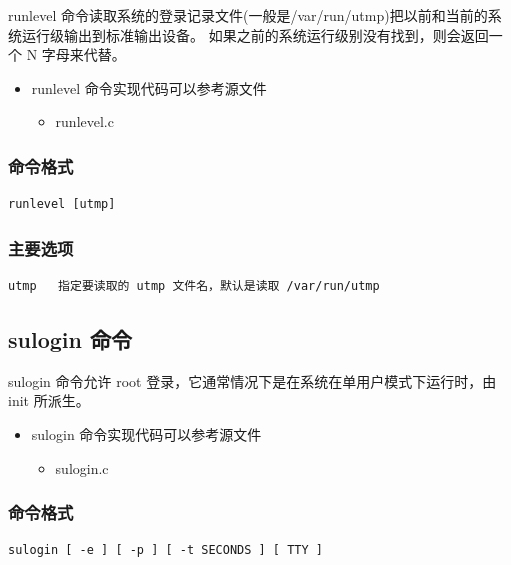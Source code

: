 runlevel
命令读取系统的登录记录文件(一般是/var/run/utmp)把以前和当前的系统运行级输出到标准输出设备。
如果之前的系统运行级别没有找到，则会返回一个 N 字母来代替。

\begin{itemize}
\item
  runlevel 命令实现代码可以参考源文件
  \begin{itemize}
  \item
    runlevel.c
  \end{itemize}
\end{itemize}
\subsubsection{命令格式}

{\begin{shaded}\begin{verbatim}
runlevel [utmp]
\end{verbatim}\end{shaded}}
\subsubsection{主要选项}

{\begin{shaded}\begin{verbatim}
utmp   指定要读取的 utmp 文件名，默认是读取 /var/run/utmp
\end{verbatim}\end{shaded}}
\subsection{sulogin 命令}

sulogin 命令允许 root 登录，它通常情况下是在系统在单用户模式下运行时，由
init 所派生。

\begin{itemize}
\item
  sulogin 命令实现代码可以参考源文件
  \begin{itemize}
  \item
    sulogin.c
  \end{itemize}
\end{itemize}
\subsubsection{命令格式}

{\begin{shaded}\begin{verbatim}
sulogin [ -e ] [ -p ] [ -t SECONDS ] [ TTY ]
\end{verbatim}\end{shaded}}

